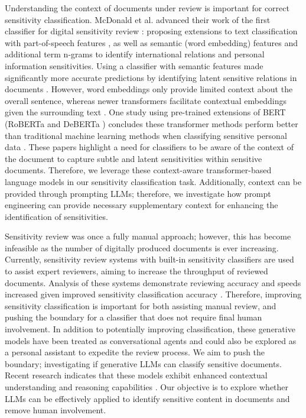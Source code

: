 Understanding the context of documents under review is important for correct sensitivity classification. McDonald et al. advanced their work of the first classifier for digital sensitivity review \cite{mcdonald2014towards}: proposing extensions to text classification with part-of-speech features \cite{mcdonald2015using}, as well as semantic (word embedding) features and additional term n-grams \cite{mcdonald2017enhancing} to identify international relations and personal information sensitivities. Using a classifier with semantic features made significantly more accurate predictions by identifying latent sensitive relations in documents \cite{mcdonald2017enhancing}. However, word embeddings only provide limited context about the overall sentence, whereas newer transformers facilitate contextual embeddings given the surrounding text \cite{noh2021improved}. One study using pre-trained extensions of BERT \cite{devlin2018bert} (RoBERTa \cite{liu2019roberta} and DeBERTa \cite{he2020deberta}) concludes these transformer methods perform better than traditional machine learning methods when classifying sensitive personal data \cite{gambarelli2023your}. These papers highlight a need for classifiers to be aware of the context of the document to capture subtle and latent sensitivities within sensitive documents. Therefore, we leverage these context-aware transformer-based language models in our sensitivity classification task. Additionally, context can be provided through prompting LLMs; therefore, we investigate how prompt engineering can provide necessary supplementary context for enhancing the identification of sensitivities.

Sensitivity review was once a fully manual approach; however, this has become infeasible as the number of digitally produced documents is ever increasing. Currently, sensitivity review systems with built-in sensitivity classifiers are used to assist expert reviewers, aiming to increase the throughput of reviewed documents. Analysis of these systems demonstrate reviewing accuracy and speeds increased given improved sensitivity classification accuracy \cite{mcdonald2020accuracy}. Therefore, improving sensitivity classification is important for both assisting manual review, and pushing the boundary for a classifier that does not require final human involvement. In addition to potentially improving classification, these generative models have been treated as conversational agents \cite{pereira2023here} and could also be explored as a personal assistant to expedite the review process. We aim to push the boundary; investigating if generative LLMs can classify sensitive documents. Recent research indicates that these models exhibit enhanced contextual understanding and reasoning capabilities \cite{adiwardana2020towards}. Our objective is to explore whether LLMs can be effectively applied to identify sensitive content in documents and remove human involvement.

